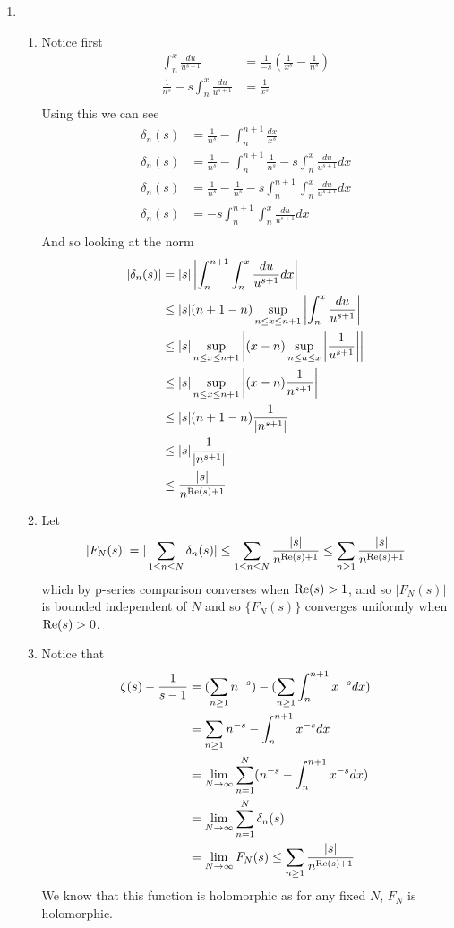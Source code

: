 \documentclass[12pt]{amsart}
\begin{document}
\begin{enumerate}
\item 
\begin{enumerate}
    \item Notice first 
\begin{align*}
    \int_{n}^x\frac{du}{u^{s+1}}&=\frac{1}{-s}(\frac{1}{x^s}-\frac{1}{n^s})\\
    \frac{1}{n^s}-s\int_{n}^x\frac{du}{u^{s+1}}&=\frac{1}{x^s}\\
\end{align*}
Using this we can see
\begin{align*}
    \delta_n(s)&=\frac{1}{n^s}-\int_{n}^{n+1}\frac{dx}{x^s}\\
    \delta_n(s)&=\frac{1}{n^s}-\int_{n}^{n+1}\frac{1}{n^s}-s\int_{n}^x\frac{du}{u^{s+1}} dx\\
    \delta_n(s)&=\frac{1}{n^s}-\frac{1}{n^s}-s\int_{n}^{n+1}\int_{n}^x\frac{du}{u^{s+1}} dx\\
    \delta_n(s)&=-s\int_{n}^{n+1}\int_{n}^x\frac{du}{u^{s+1}} dx\\
\end{align*}
And so looking at the norm
\begin{align*}
    |\delta_n(s)|&=|s|\left| \int_{n}^{n+1}\int_{n}^x\frac{du}{u^{s+1}} dx \right|\\
    &\leq|s|(n+1-n)\sup_{n\leq x\leq n+1}\left| \int_{n}^x\frac{du}{u^{s+1}} \right|\\
    &\leq|s|\sup_{n\leq x\leq n+1}\left| (x-n)\sup_{n\leq u\leq x}\left| \frac{1}{u^{s+1}} \right| \right|\\
    &\leq|s|\sup_{n\leq x\leq n+1}\left| (x-n)\frac{1}{n^{s+1}} \right|\\
    &\leq|s|(n+1-n)\frac{1}{|n^{s+1}|}\\
    &\leq|s|\frac{1}{|n^{s+1}|}\\
    &\leq\frac{|s|}{n^{\operatorname{\mathrm{Re}}(s)+1}}\\
\end{align*}

\item Let 
$$|F_N(s)|=|\sum_{1\leq n\leq N}\delta_n(s)|\leq\sum_{1\leq n\leq N}\frac{|s|}{n^{\operatorname{\mathrm{Re}}(s)+1}}\leq \sum_{n\geq 1}\frac{|s|}{n^{\operatorname{\mathrm{Re}}(s)+1}}$$
which by p-series comparison converses when $\operatorname{\mathrm{Re}}(s)>1$, 
and so $|F_N(s)|$ is bounded independent of $N$ and so $\{F_N(s)\}$ converges uniformly when $\operatorname{\mathrm{Re}}(s)>0$.\\

\item Notice that
\begin{align*}
    \zeta(s)-\frac{1}{s-1}&=(\sum_{n\geq 1}n^{-s})-(\sum_{n\geq 1}\int_{n}^{n+1}x^{-s}dx)\\
    &=\sum_{n\geq 1}n^{-s}-\int_{n}^{n+1}x^{-s}dx\\
    &=\lim_{N\rightarrow \infty}\sum_{n=1}^N( n^{-s}-\int_{n}^{n+1}x^{-s}dx)\\
    &=\lim_{N\rightarrow \infty}\sum_{n=1}^N\delta_n(s)\\
    &=\lim_{N\rightarrow \infty}F_N(s)\leq \sum_{n\geq 1}\frac{|s|}{n^{\operatorname{\mathrm{Re}}(s)+1}}
\end{align*}
We know that this function is holomorphic as for any fixed $N$, $F_N$ is holomorphic.

\end{enumerate}
\end{enumerate}
\end{document}
